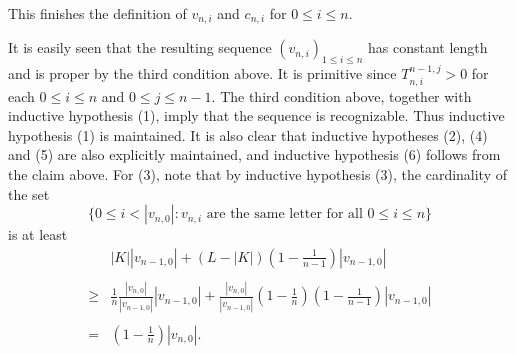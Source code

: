 \documentclass{amsart}
\theoremstyle{definition}
\theoremstyle{problem}
\theoremstyle{remark}
\numberwithin{equation}{section}
\begin{document}
This finishes the definition of $v_{n,i}$ and $c_{n,i}$ for $0\leq i\leq n$. 

It is easily seen that the resulting sequence $(v_{n,i})_{1\leq  i\leq n}$ has constant length and is proper by the third condition above. It is primitive since $T^{n-1,j}_{n,i}>0$ for each $0\leq i\leq n$ and $0\leq j\leq n-1$. The third condition above, together with inductive hypothesis (1), imply that the sequence is recognizable. Thus inductive hypothesis (1) is maintained. It is also clear that inductive hypotheses (2), (4) and (5) are also explicitly maintained, and inductive hypothesis (6) follows from the claim above. For  (3), note that by inductive hypothesis (3), the cardinality of the set
$$ \{0\leq i<|v_{n,0}|\colon \mbox{$v_{n,i}$ are the same letter for all $0\leq i\leq n$}\} $$
is at least 
$$\begin{array}{rl}
 & |K||v_{n-1,0}|+(L-|K|)\left(1-\displaystyle\frac{1}{n-1}\right)|v_{n-1,0}| \\ \\
 \geq & %
 \displaystyle\frac{1}{n}\displaystyle\frac{|v_{n,0}|}{|v_{n-1,0}|}|v_{n-1,0}| + \displaystyle\frac{|v_{n,0}|}{|v_{n-1,0}|}\left(1-\displaystyle\frac{1}{n}\right)\left(1-\displaystyle\frac{1}{n-1}\right)|v_{n-1,0}| \\ \\
= & \left(1-\displaystyle\frac{1}{n}\right)|v_{n,0}|.
  \end{array}
  $$

\end{document}
